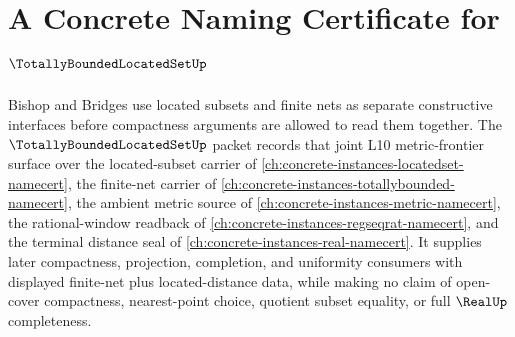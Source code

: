 \chapter{A Concrete Naming Certificate for $\TotallyBoundedLocatedSetUp$}
\label{ch:concrete-instances-totally-bounded-located-set-namecert}

Bishop and Bridges use located subsets and finite nets as separate constructive interfaces before compactness arguments are allowed to read them together. The $\TotallyBoundedLocatedSetUp$ packet records that joint L10 metric-frontier surface over the located-subset carrier of \autoref{ch:concrete-instances-locatedset-namecert}, the finite-net carrier of \autoref{ch:concrete-instances-totallybounded-namecert}, the ambient metric source of \autoref{ch:concrete-instances-metric-namecert}, the rational-window readback of \autoref{ch:concrete-instances-regseqrat-namecert}, and the terminal distance seal of \autoref{ch:concrete-instances-real-namecert}. It supplies later compactness, projection, completion, and uniformity consumers with displayed finite-net plus located-distance data, while making no claim of open-cover compactness, nearest-point choice, quotient subset equality, or full $\RealUp$ completeness.

